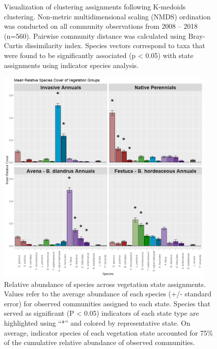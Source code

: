 \documentclass[twoside,12pt,final]{ucthesis-CA2012}
\begin{document}
\begin{ucmainmatter}
\begin{figure}
\caption{Visualization of clustering assignments following K-medoids clustering. Non-metric multidimensional scaling (NMDS) ordination was conducted on all community observations from 2008 -- 2018 (n=560). Pairwise community distance was calculated using Bray-Curtis dissimilarity index. Species vectors correspond to taxa that were found to be significantly associated (p \textless{} 0.05) with state assignments using indicator species analysis. \label{app-3-1}}
\end{figure}
\begin{figure}
\centering
\includegraphics[width=0.95\textwidth,height=0.7\textheight]{figure/AppFig3_2.png}
\caption{Relative abundance of species across vegetation state assignments. Values refer to the average abundance of each species (+/- standard error) for observed communities assigned to each state. Species that served as significant (P \textless{} 0.05) indicators of each state type are highlighted using ``*'' and colored by representative state. On average, indicator species of each vegetation state accounted for 75\% of the cumulative relative abundance of observed communities. \label{app-3-2}}
\end{figure}
\begin{figure}
\centering

\end{figure}
\end{ucmainmatter}
\end{document}
